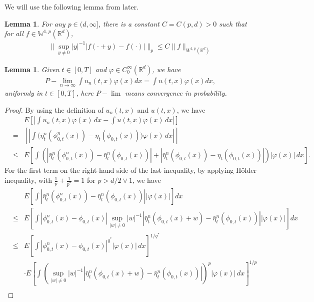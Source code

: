 \documentclass[12pt,oneside, reqno]{amsart}
\newcommand{\be}{\begin{eqnarray}}
\newcommand{\ee}{\end{eqnarray}}
\newcommand{\ce}{\begin{eqnarray*}}
\newcommand{\de}{\end{eqnarray*}}
\newtheorem{lemma}[theorem]{Lemma}
\def\mR{{\mathbb R}}
\def\mW{{\mathbb W}}
\def\leq{\leqslant}
\numberwithin{equation}{section}
\begin{document}
We will use the following lemma from \cite[Lemma 5]{Mikulevicius1992} later.
	\begin{lemma}\label{difference-estimate1}
		 For any $p\in (d,\infty]$, there is a constant $C=C(p,d)>0$ such that for all $f\in \mW^{1,p}(\mR^d)$,
		\be\label{imparticular-estimate-1}
		\| \sup_{y\neq 0}|y|^{-1}|f(\cdot+y)-f(\cdot)|\|_p\leq C\| f\|_{W^{1,p}(\mR^d)}
		\ee 
	\end{lemma}
	\begin{lemma}\label{Cricial-convergence1}
	Given $t\in[0,T]$ and $\varphi\in C_0^{\infty}(\mR^d)$, we have 
		\ce 
		P-\lim_{n\to \infty} \int u_n(t,x)\varphi(x) dx =\int u(t,x)\varphi(x)dx,
		\de 
uniformly in $t\in[0,T]$,	here $P-\lim$ means convergence in probability.
	\end{lemma}
\begin{proof}
By using the definition of $u_n(t,x)$ and $u(t,x)$, we have 
   	\ce 
   &&E\left[\left|\int u_n(t,x)\varphi(x) \,dx-\int u(t,x)\varphi(x) \,dx\right|\right]\\
   &=&\left[\left|\int\bigg(\bar\eta_t^n(\phi_{0,t}^n(x))- \eta_t(\phi_{0,t}(x))\bigg)\varphi(x)\, dx\right|\right]\\
    &\leq &E\left[\int \left(\left|\bar\eta_t^n(\phi_{0,t}^n(x))-\bar\eta_t^n(\phi_{0,t}(x))\right|+\left|\bar\eta_t^n(\phi_{0,t}(x))-\eta_t(\phi_{0,t}(x))\right|\right)|\varphi(x)| \,dx\right].
   \de
  For the first term on the right-hand side  of the last inequality, by applying H\"{o}lder inequality, with  $\frac{1}{p}+\frac{1}{p^*}=1$ for $p>d/2\vee 1$, we have 
   \ce 
   &&E\left[\int \left|\bar\eta_t^n(\phi_{0,t}^n(x))-\bar\eta_t^n(\phi_{0,t}(x))\right||\varphi(x)| \right]dx\\
   &\leq &E\left[\int|\phi_{0,t}^n(x)-\phi_{0,t}(x)| \sup_{|w|\neq 0}|w|^{-1}\left|\bar\eta_t^n(\phi_{0,t}(x)+w)-\bar\eta_t^n(\phi_{0,t}(x))\right||\varphi(x)| \right]dx\\
  &\leq &E\left[\int|\phi_{0,t}^n(x)-\phi_{0,t}(x)|^{q^*}|\varphi(x)|\,dx\right]^{1/q^*}\\
  &&\cdot E\left[\int\left(\sup_{|w|\neq 0}|w|^{-1}\left|\bar\eta_t^n(\phi_{0,t}(x)+w)-\bar\eta_t^n(\phi_{0,t}(x))\right|\right)^p|\varphi(x)|\,dx\right]^{1/p}\\ 
   \de 
   

\end{proof}
\end{document}

